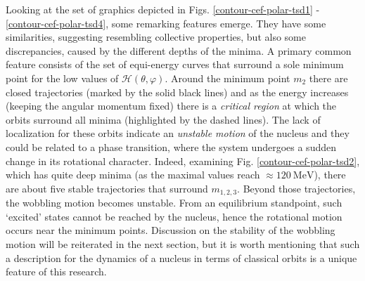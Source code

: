 Looking at the set of graphics depicted in Figs. \ref{contour-cef-polar-tsd1} - \ref{contour-cef-polar-tsd4}, some remarking features emerge. They have some similarities, suggesting resembling collective properties, but also some discrepancies, caused by the different depths of the minima. A primary common feature consists of the set of equi-energy curves that surround a sole minimum point for the low values of $\mathcal{H}(\theta,\varphi)$. Around the minimum point $m_2$ there are closed trajectories (marked by the solid black lines) and as the energy increases (keeping the angular momentum fixed) there is a \emph{critical region} at which the orbits surround all minima (highlighted by the dashed lines). The lack of localization for these orbits indicate an \emph{unstable motion} of the nucleus and they could be related to a phase transition, where the system undergoes a sudden change in its rotational character. Indeed, examining Fig. \ref{contour-cef-polar-tsd2}, which has quite deep minima (as the maximal values reach $\approx 120\ \text{MeV}$), there are about five stable trajectories that surround $m_{1,2,3}$. Beyond those trajectories, the wobbling motion becomes unstable. From an equilibrium standpoint, such `excited' states cannot be reached by the nucleus, hence the rotational motion occurs near the minimum points. Discussion on the stability of the wobbling motion will be reiterated in the next section, but it is worth mentioning that such a description for the dynamics of a nucleus in terms of classical orbits is a unique feature of this research.


